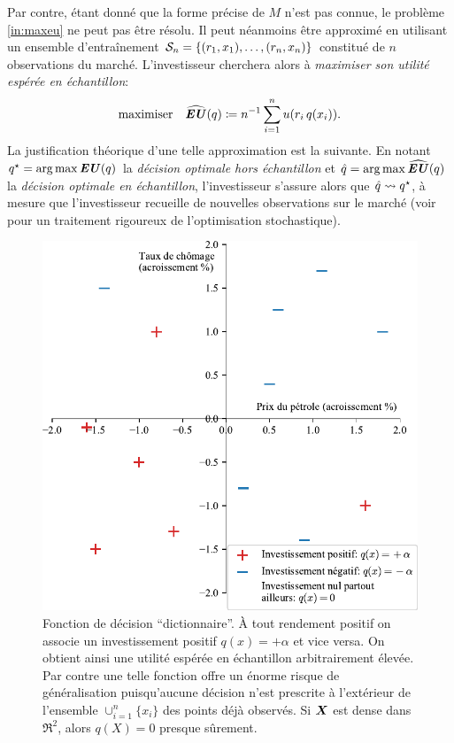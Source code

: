 Par contre, étant donné que la forme précise de $M$ n'est pas connue, le problème
\eqref{in:maxeu} ne peut pas être résolu. Il peut néanmoins être approximé en utilisant un
ensemble d'entraînement $\S_n = \{(r_1,x_1),\ldots,(r_n,x_n)\}$ constitué de $n$
observations du marché. L'investisseur cherchera alors à \textit{maximiser son utilité
  espérée en échantillon}:
\begin{equation}
  \maximizeEquation{\hEU(q) \coloneqq n^{-1} \sumi u(r_i\,q(x_i)).}
\end{equation}
La justification théorique d'une telle approximation est la suivante. En notant
$q^\star = \argmax\EU(q)$ la \textit{décision optimale hors échantillon} et
$\qh = \argmax\hEU(q)$ la \textit{décision optimale en échantillon}, l'investisseur
s'assure alors que $\qh \leadsto q^\star$, à mesure que l'investisseur recueille de nouvelles
observations sur le marché (voir \cite{shapiro2009lectures} pour un traitement rigoureux
de l'optimisation stochastique).


\begin{figure}
  \centering
  \includegraphics[width=\textwidth]{../experiments/fig/pres/pres2_fr.pdf}
  \caption[Décision ``dictionnaire'']{Fonction de décision ``dictionnaire''. À tout
    rendement positif on associe un investissement positif $q(x)=+\alpha$ et vice versa. On
    obtient ainsi une utilité espérée en échantillon arbitrairement élevée. Par contre une
    telle fonction offre un énorme risque de généralisation puisqu'aucune décision n'est
    prescrite à l'extérieur de l'ensemble $\cup_{i=1}^n\{x_i\}$ des points déjà observés. Si
    $\X$ est dense dans $\Re^2$, alors $q(X)=0$ presque sûrement. }
  \label{fig_pres2}
\end{figure}

